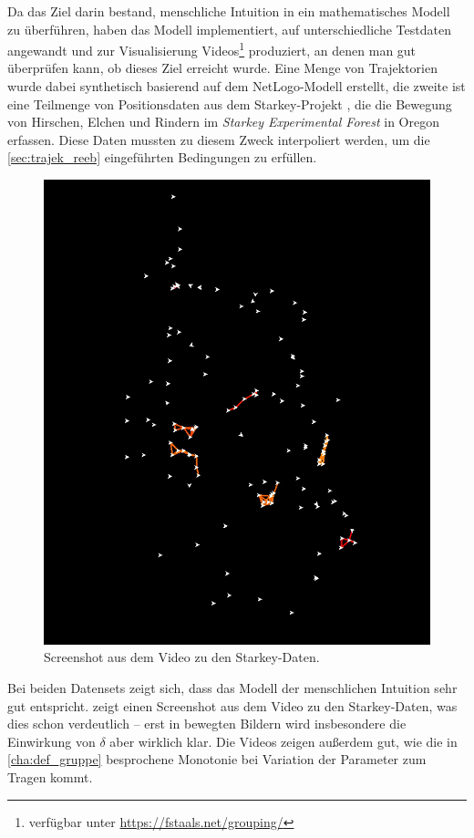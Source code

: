 Da das Ziel darin bestand, menschliche Intuition in ein mathematisches Modell zu überführen, haben \textcite{buchin2015} das Modell implementiert, auf unterschiedliche Testdaten angewandt und zur Visualisierung Videos\footnote{verfügbar unter \url{https://fstaals.net/grouping/}} produziert, an denen man gut überprüfen kann, ob dieses Ziel erreicht wurde.
Eine Menge von Trajektorien wurde dabei synthetisch basierend auf dem NetLogo-Modell  \cite{netlogo} erstellt, die zweite ist eine Teilmenge von Positionsdaten aus dem Starkey-Projekt \cite{starkey}, die die Bewegung von Hirschen, Elchen und Rindern im \emph{Starkey Experimental Forest} in Oregon erfassen. 
Diese Daten mussten zu diesem Zweck interpoliert werden, um die \cref{sec:trajek_reeb} eingeführten Bedingungen zu erfüllen.

\begin{figure}[hbtp]
    \Centering
    \includegraphics[width=.5\textwidth]{videos/starkey.png}
    \caption{Screenshot aus dem Video zu den Starkey-Daten.}\label{fig:starkey}
\end{figure}

Bei beiden Datensets zeigt sich, dass das Modell der menschlichen Intuition sehr gut entspricht.
 zeigt einen Screenshot aus dem Video zu den Starkey-Daten, was dies schon verdeutlich -- erst in bewegten Bildern wird insbesondere die Einwirkung von $\delta$ aber wirklich klar.
Die Videos zeigen außerdem gut, wie die in \cref{cha:def_gruppe} besprochene Monotonie bei Variation der Parameter zum Tragen kommt.
